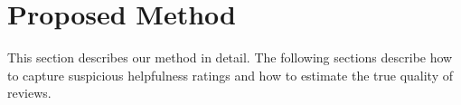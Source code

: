 \documentclass[master,english,final]{kaist-ucs}
\begin{document}
\chapter{Proposed Method}
This section describes our method in detail.
The following sections describe how to capture suspicious helpfulness ratings and how to estimate the true quality of reviews.
\end{document}
